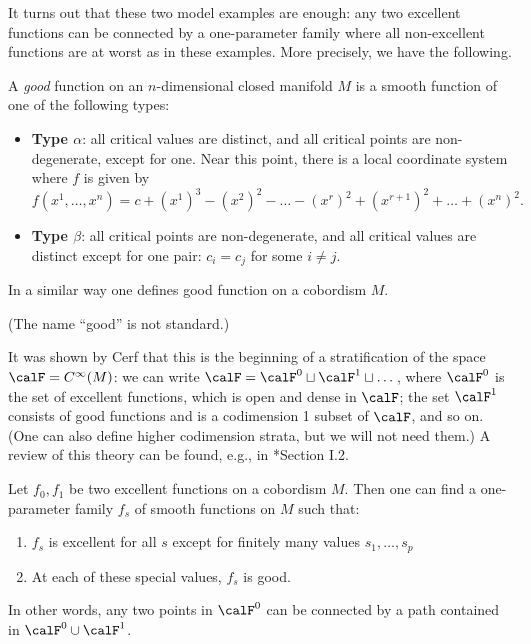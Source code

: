 It turns out that these two model examples are enough: any two excellent
functions can be connected by a one-parameter family where all non-excellent
functions are at worst as in these examples. More precisely, we have the
following.

\begin{definition}\label{d:morse-good}
  A \emph{good}  function on an $n$-dimensional closed manifold $M$ is a
  smooth function of one of the following types:
  \begin{itemize}
    \item {\bf Type $\alpha$}: all critical values are distinct, and all
      critical points are non-degenerate, except for one. Near this point,
      there is a local coordinate system where $f$ is given by
      $$
      f(x^1, \dots, x^n)=c+(x^1)^3 -(x^2)^2-\dots -(x^r)^2+(x^{r+1})^2 +
                        \dots +(x^n)^2.
      $$
    \item {\bf Type $\beta$}: all critical points are non-degenerate, and
      all critical values are distinct except for one pair: $c_i = c_j$
      for some $i\ne j$.
  \end{itemize}
  In a similar way one defines good function on a cobordism $M$.
\end{definition}

(The name ``good'' is not standard.)

It was shown by Cerf that this is the beginning of a stratification of the
space $\calF=C^\infty(M)$: we can write
$\calF = \calF^0\sqcup \calF^1\sqcup\dots$,
where $\calF^0$ is the set of excellent functions, which is open and dense in
$\calF$; the set $\calF^1$ consists of good functions and is a codimension 1
subset of $\calF$, and so on. (One can also define higher codimension strata,
but we will not need them.) A review of this theory can be found, e.g., in
*{Section I.2}.

\begin{theorem}\label{t:cerf1}
  Let $f_0, f_1$ be two excellent functions on a cobordism $M$. Then one can
  find a one-parameter family $f_s$ of smooth functions on $M$ such that:
  \begin{enumerate}
    \item $f_s$ is excellent for all $s$ except for finitely
      many values $s_1, \dots, s_p$
    \item At each of these special values, $f_s$ is good.
  \end{enumerate}
\end{theorem}
In other words, any two points in $\calF^0$ can be connected by a path
contained in $\calF^0\cup \calF^1$.

